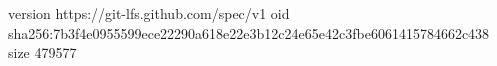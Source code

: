 version https://git-lfs.github.com/spec/v1
oid sha256:7b3f4e0955599ece22290a618e22e3b12c24e65e42c3fbe6061415784662c438
size 479577
